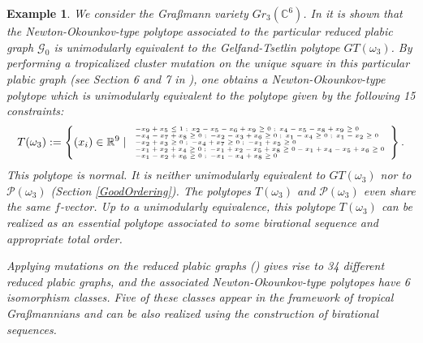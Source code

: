 \documentclass{emsprocart}
\newtheorem{example}[theorem]{Example}
\theoremstyle{definition}
\begin{document}
\begin{example}\rm\label{GR36}
We consider the Gra\ss mann variety $Gr_{3}(\mathbb C^6)$. In \cite{RW} it is shown
that the Newton-Okounkov-type polytope associated to the particular reduced plabic graph $\mathcal G_0$
is unimodularly equivalent to the Gelfand-Tsetlin polytope $GT(\omega_3)$. By performing a 
tropicalized cluster mutation on the unique square in this particular plabic graph 
(see Section 6 and 7 in \cite{RW}), one obtains a Newton-Okounkov-type polytope 
which is unimodularly equivalent to the polytope given by the following 15 constraints:
\[
{\tiny
T(\omega_3) := \left\{ (x_i) \in \mathbb{R}^9 \mid \begin{array}{l}  -x_9 + x_5 \leq 1 \; ; \; x_2 - x_5 - x_6 + x_9 \geq 0\; ; \; x_4 - x_5 - x_8 + x_9 \geq 0 \\ 
-x_4 - x_7 + x_8 \geq 0\; ; \; -x_2 - x_3 + x_6 \geq 0    \; ; \;  x_1 - x_4 \geq 0    \; ; \; x_1 - x_2 \geq 0\\  
-x_2 + x_3 \geq 0\; ; \; -x_4 + x_7 \geq 0   \; ; \; -x_1 + x_5 \geq 0 \\ 
-x_1 + x_2 + x_4 \geq 0   \; ; \; -x_1 + x_2 - x_5 + x_8 \geq 0    -x_1 + x_4 - x_5 + x_6 \geq 0  \\
 -x_1 - x_2 + x_6 \geq 0     \; ; \; -x_1 - x_4 + x_8 \geq 0   
 \end{array}
\right\}.
}
\]
This polytope is normal. It is neither unimodularly equivalent to $GT(\omega_3)$ nor to $\mathcal{P}(\omega_3)$ (Section \ref{GoodOrdering}). The polytopes $T(\omega_3)$ and $\mathcal{P}(\omega_3)$ even share the same $f$-vector. Up to a unimodularly equivalence, this polytope $T(\omega_3)$ can be realized as an essential polytope associated to some birational sequence and appropriate total order.
\par
Applying mutations on the reduced plabic graphs (\cite{RW}) gives rise to 34 different reduced plabic graphs, and the associated Newton-Okounkov-type polytopes have 6 isomorphism classes. Five of these classes appear in the framework of tropical Gra\ss mannians \cite{SS} and can be also realized using the construction of birational sequences.
\end{example}
\end{document}
